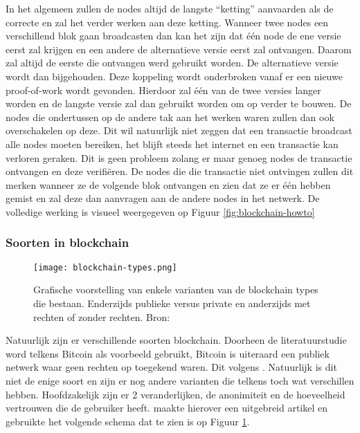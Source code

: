 In het algemeen zullen de nodes altijd de langste ``ketting'' aanvaarden als de correcte en zal het verder werken aan deze ketting. Wanneer twee nodes een verschillend blok gaan broadcasten dan kan het zijn dat één node de ene versie eerst zal krijgen en een andere de alternatieve versie eerst zal ontvangen. Daarom zal altijd de eerste die ontvangen werd gebruikt worden. De alternatieve versie wordt dan bijgehouden. Deze koppeling wordt onderbroken vanaf er een nieuwe proof-of-work wordt gevonden. Hierdoor zal één van de twee versies langer worden en de langste versie zal dan gebruikt worden om op verder te bouwen. De nodes die ondertussen op de andere tak aan het werken waren zullen dan ook overschakelen op deze. Dit wil natuurlijk niet zeggen dat een transactie broadcast alle nodes moeten bereiken, het blijft steeds het internet en een transactie kan verloren geraken. Dit is geen probleem zolang er maar genoeg nodes de transactie ontvangen en deze verifiëren. De nodes die die transactie niet ontvingen zullen dit merken wanneer ze de volgende blok ontvangen en zien dat ze er één hebben gemist en zal deze dan aanvragen aan de andere nodes in het netwerk. De volledige werking is visueel weergegeven op Figuur \ref{fig:blockchain-howto}

\subsubsection{Soorten in blockchain}

\begin{figure}
	\texttt{[image: blockchain-types.png]}
	\caption{Grafische voorstelling van enkele varianten van de blockchain types die bestaan. Enderzijds publieke versus private en anderzijds met rechten of zonder rechten. Bron: \textcite{Kravchenko2016}}
	\label{fig:blockchain-types}
\end{figure}

Natuurlijk zijn er verschillende soorten blockchain. Doorheen de literatuurstudie word telkens Bitcoin als voorbeeld gebruikt, Bitcoin is uiteraard een publiek netwerk waar geen rechten op toegekend waren. Dit volgens \textcite{Nakamoto2008}. Natuurlijk is dit niet de enige soort en zijn er nog andere varianten die telkens toch wat verschillen hebben. Hoofdzakelijk zijn er 2 veranderlijken, de anonimiteit en de hoeveelheid vertrouwen die de gebruiker heeft. \textcite{Kravchenko2016} maakte hierover een uitgebreid artikel en gebruikte het volgende schema dat te zien is op Figuur \ref{fig:blockchain-types}.

